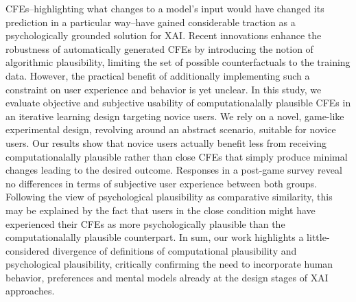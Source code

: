 \Glspl{CFE}--highlighting what changes to a model's input would have changed its prediction in a particular way--have gained considerable traction as a psychologically grounded solution for \gls{XAI}. 
Recent innovations enhance the robustness of automatically generated \glspl{CFE} by introducing the notion of algorithmic plausibility, limiting the set of possible counterfactuals to the training data.
However, the practical benefit of additionally implementing such a constraint on user experience and behavior is yet unclear.
In this study, we evaluate objective and subjective usability of computationalally plausible \glspl{CFE} in an iterative learning design targeting novice users.
We rely on a novel, game-like experimental design, revolving around an abstract scenario, suitable for novice users.
Our results show that novice users actually benefit less from receiving computationalally plausible rather than close \glspl{CFE} that simply produce minimal changes leading to the desired outcome.
Responses in a post-game survey reveal no differences in terms of subjective user experience between both groups.
Following the view of psychological plausibility as comparative similarity, this may be explained by the fact that users in the close condition might have experienced their \glspl{CFE} as more psychologically plausible than the computationalally plausible counterpart.
In sum, our work highlights a little-considered divergence of definitions of computational plausibility and psychological plausibility, critically confirming the need to incorporate human behavior, preferences and mental models already at the design stages of \gls{XAI} approaches.